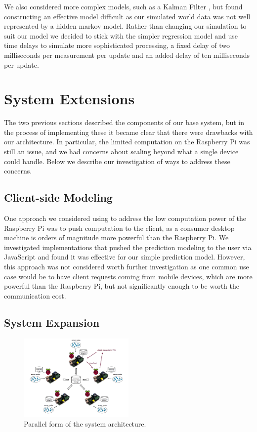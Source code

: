 \documentclass[a4paper]{acm_proc_article-sp}
\begin{document}
We also considered more complex models, such as a Kalman Filter \cite{kalman}, but found constructing an effective model difficult as our simulated world data was not well represented by a hidden markov model.  Rather than changing our simulation to suit our model we decided to stick with the simpler regression model and use time delays to simulate more sophisticated processing, a fixed delay of two milliseconds per measurement per update and an added delay of ten milliseconds per update.

\section{System Extensions}

The two previous sections described the components of our base system, but in the process of implementing these it became clear that there were drawbacks with our architecture.  In particular, the limited computation on the Raspberry Pi was still an issue, and we had concerns about scaling beyond what a single device could handle.  Below we describe our investigation of ways to address these concerns.

\subsection{Client-side Modeling}

One approach we considered using to address the low computation power of the Raspberry Pi was to push computation to the client, as a consumer desktop machine is orders of magnitude more powerful than the Raspberry Pi.  We investigated implementations that pushed the prediction modeling to the user via JavaScript and found it was effective for our simple prediction model.  However, this approach was not considered worth further investigation as one common use case would be to have client requests coming from mobile devices, which are more powerful than the Raspberry Pi, but not significantly enough to be worth the communication cost.

\subsection{System Expansion}

\begin{figure}
  \centering
      \includegraphics[width=0.5\textwidth]{architecture.png}
  \caption{\label{fig:parallel}Parallel form of the system architecture.}
\end{figure}
\end{document}
